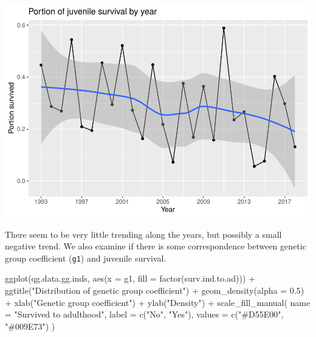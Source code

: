 \documentclass[
]{article}
\newenvironment{Shaded}{\begin{snugshade}}{\end{snugshade}}
\newcommand{\AttributeTok}[1]{\textcolor[rgb]{0.77,0.63,0.00}{#1}}
\newcommand{\FloatTok}[1]{\textcolor[rgb]{0.00,0.00,0.81}{#1}}
\newcommand{\FunctionTok}[1]{\textcolor[rgb]{0.00,0.00,0.00}{#1}}
\newcommand{\NormalTok}[1]{#1}
\newcommand{\SpecialCharTok}[1]{\textcolor[rgb]{0.00,0.00,0.00}{#1}}
\newcommand{\StringTok}[1]{\textcolor[rgb]{0.31,0.60,0.02}{#1}}
\begin{document}
\includegraphics{EDA_files/figure-latex/unnamed-chunk-9-1.pdf}

There seem to be very little trending along the years, but possibly a
small negative trend. We also examine if there is some correspondence
between genetic group coefficient (\texttt{g1}) and juvenile survival.

\begin{Shaded}
\begin{Highlighting}[]
\FunctionTok{ggplot}\NormalTok{(qg.data.gg.inds, }\FunctionTok{aes}\NormalTok{(}\AttributeTok{x =}\NormalTok{ g1, }\AttributeTok{fill =} \FunctionTok{factor}\NormalTok{(surv.ind.to.ad))) }\SpecialCharTok{+}
  \FunctionTok{ggtitle}\NormalTok{(}\StringTok{"Distribution of genetic group coefficient"}\NormalTok{) }\SpecialCharTok{+}
  \FunctionTok{geom\_density}\NormalTok{(}\AttributeTok{alpha =} \FloatTok{0.5}\NormalTok{) }\SpecialCharTok{+}
  \FunctionTok{xlab}\NormalTok{(}\StringTok{"Genetic group coefficient"}\NormalTok{) }\SpecialCharTok{+}
  \FunctionTok{ylab}\NormalTok{(}\StringTok{"Density"}\NormalTok{) }\SpecialCharTok{+}
  \FunctionTok{scale\_fill\_manual}\NormalTok{(}
    \AttributeTok{name =} \StringTok{"Survived to adulthood"}\NormalTok{,}
    \AttributeTok{label =} \FunctionTok{c}\NormalTok{(}\StringTok{"No"}\NormalTok{, }\StringTok{"Yes"}\NormalTok{),}
    \AttributeTok{values =} \FunctionTok{c}\NormalTok{(}\StringTok{"\#D55E00"}\NormalTok{, }\StringTok{"\#009E73"}\NormalTok{)}
\NormalTok{  )}
\end{Highlighting}
\end{Shaded}
\end{document}
